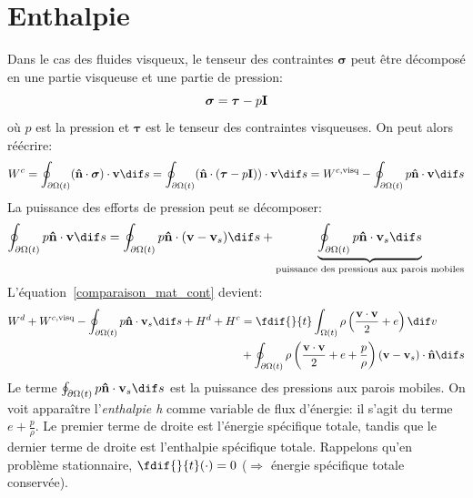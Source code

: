 \section{Enthalpie}
Dans le cas des fluides visqueux, le tenseur des contraintes $\boldsymbol{\sigma}$ peut être décomposé en une partie visqueuse et une partie de pression:
$$\boldsymbol{\sigma}=\boldsymbol{\tau}-p\textbf{I}$$ où $p$ est la pression et $\boldsymbol{\tau}$ est le tenseur des contraintes visqueuses. On peut alors réécrire:
$$W^c=\oint_{\partial\Omega (t)}(\fv{\^n}\cdot\boldsymbol{\sigma})\cdot\fv{v} \dif s=\oint_{\partial\Omega (t)}(\fv{\^n}\cdot(\boldsymbol{\tau}-p\fv{I}))\cdot\fv{v} \dif s=W^{c,\text{visq}}-\oint_{\partial\Omega (t)}p\fv{\^n}\cdot\fv{v} \dif s$$
La puissance des efforts de pression peut se décomposer:
$$\oint_{\partial\Omega (t)}p\fv{\^n}\cdot\fv{v} \dif s=\oint_{\partial\Omega (t)}p\fv{\^n}\cdot(\fv{v}-\fv{v}_s) \dif s+\underbrace{\oint_{\partial\Omega (t)}p\fv{\^n}\cdot\fv{v}_s \dif s}_{\text{puissance des pressions aux parois mobiles}}$$
L'équation~\eqref{comparaison_mat_cont} devient:
\begin{align*}
W^d+W^{c,\text{visq}}-\oint_{\partial\Omega (t)}p\fv{\^n}\cdot\fv{v}_s \dif s+H^d+H^c&=\fdif{}{t}\int_{\Omega (t)}\rho\left(\frac{\fv{v}\cdot\fv{v}}{2}+e\right) \dif v\\
 &+\oint_{\partial\Omega (t)}\rho\left(\frac{\fv{v}\cdot\fv{v}}{2}+e+\frac{p}{\rho}\right)(\fv{v}-\fv{v}_s)\cdot\fv{\^n} \dif s\\
\end{align*}
Le terme $\oint_{\partial\Omega (t)}p\fv{\^n}\cdot\fv{v}_s \dif s$ est la puissance des pressions aux parois mobiles. On voit apparaître l'\emph{enthalpie h} comme variable de flux d'énergie: il s'agit du terme $e+\frac{p}{\rho}$. Le premier terme de droite est l'énergie spécifique totale, tandis que le dernier terme de droite est l'enthalpie spécifique totale. Rappelons qu'en problème stationnaire, $\fdif{}{t}(\cdot)=0$ ($\Rightarrow$ énergie spécifique totale conservée).

